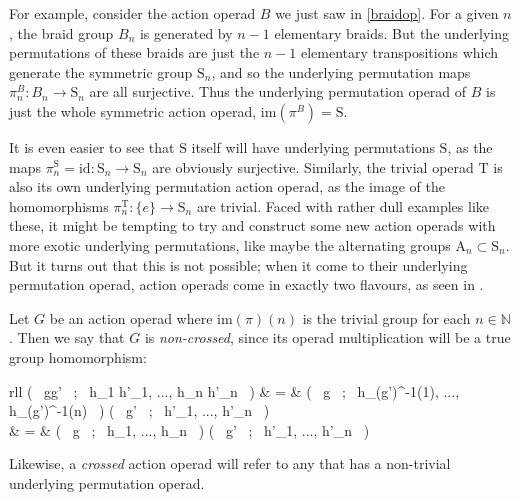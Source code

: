 For example, consider the action operad $B$ we just saw in \cref{braidop}. For a given $n$, the braid group $B_n$ is generated by $n-1$ elementary braids. But the underlying permutations of these braids are just the $n-1$ elementary transpositions which generate the symmetric group $\mathrm{S}_n$, and so the underlying permutation maps $\pi^{B}_n : B_n \to \mathrm{S}_n$ are all surjective. Thus the underlying permutation operad of $B$ is just the whole symmetric action operad, $\mathrm{im}(\pi^B) = \mathrm{S}$.

It is even easier to see that $\mathrm{S}$ itself will have underlying permutations $\mathrm{S}$, as the maps $\pi^{\mathrm{S}}_n = \mathrm{id} : \mathrm{S}_n \to \mathrm{S}_n$ are obviously surjective. Similarly, the trivial operad $\mathrm{T}$ is also its own underlying permutation action operad, as the image of the homomorphisms $\pi^{\mathrm{T}}_n : \{ e \} \to \mathrm{S}_n$ are trivial. Faced with rather dull examples like these, it might be tempting to try and construct some new action operads with more exotic underlying permutations, like maybe the alternating groups $\mathrm{A}_n \subset \mathrm{S}_n$. But it turns out that this is not possible; when it come to their underlying permutation operad, action operads come in exactly two flavours, as seen in \cite{groupop}.

\begin{defn} Let $G$ be an action operad where $\mathrm{im}(\pi)(n)$ is the trivial group for each $n \in \mathbb{N}$. Then we say that $G$ is \emph{non-crossed}, since its operad multiplication will be a true group homomorphism:
\begin{eq*} \begin{array}{rll}
			\mu( \, gg' \, ; \, h_1 h'_1, ..., h_n h'_n \, ) & = & \mu( \, g \, ; \, h_{\pi(g')^{-1}(1)}, ..., h_{\pi(g')^{-1}(n)} \, ) \mu( \, g' \, ; \, h'_1, ..., h'_n \, ) \\
			& = & \mu( \, g \, ; \, h_1, ..., h_n \, ) \mu( \, g' \, ; \, h'_1, ..., h'_n \, ) \\
		\end{array}
\end{eq*}
Likewise, a \emph{crossed} action operad will refer to any that has a non-trivial underlying permutation operad.
\end{defn}


